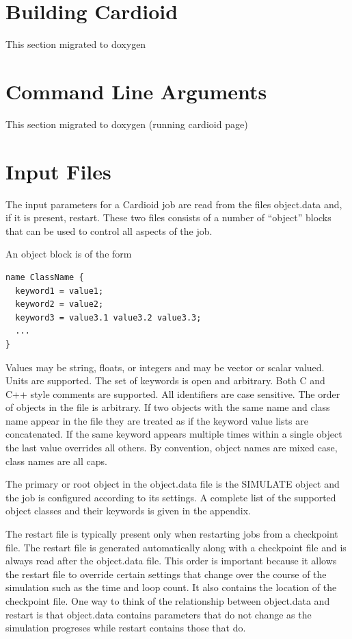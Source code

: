 \documentclass{article}
\begin{document}
\def\path#1{#1}

\long{}

\section{Building Cardioid}

This section migrated to doxygen

\section{Command Line Arguments}

This section migrated to doxygen (running cardioid page)

\section{Input Files}

The input parameters for a Cardioid job are read from the files
\path{object.data} and, if it is present, \path{restart}.  These two
files consists of a number of ``object'' blocks that can be used to
control all aspects of the job.

An object block is of the form
\begin{verbatim}
name ClassName { 
  keyword1 = value1; 
  keyword2 = value2;
  keyword3 = value3.1 value3.2 value3.3;
  ...
}
\end{verbatim}
Values may be string, floats, or integers and may be vector or scalar
valued.  Units are supported.  The set of keywords is open and
arbitrary.  Both C and C++ style comments are supported.  All
identifiers are case sensitive.  The order of objects in the file is
arbitrary.  If two objects with the same name and class name appear in
the file they are treated as if the keyword value lists are
concatenated.  If the same keyword appears multiple times within a
single object the last value overrides all others.  By convention,
object names are mixed case, class names are all caps.


The primary or root object in the \path{object.data} file is the
SIMULATE object and the job is configured according to its settings.  A
complete list of the supported object classes and their keywords is
given in the appendix.

The \path{restart} file is typically present only when restarting jobs
from a checkpoint file.  The \path{restart} file is generated
automatically along with a checkpoint file and is always read after the
\path{object.data} file.  This order is important because it allows the
\path{restart} file to override certain settings that change over the
course of the simulation such as the time and loop count.  It also
contains the location of the checkpoint file.  One way to think of the
relationship between \path{object.data} and \path{restart} is that
\path{object.data} contains parameters that do not change as the
simulation progreses while \path{restart} contains those that do.
\end{document}
